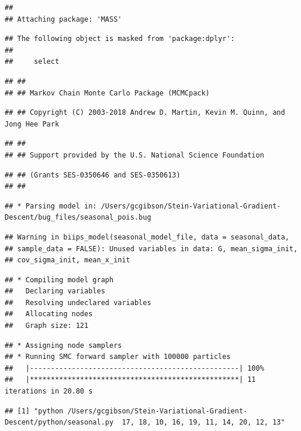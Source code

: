 \documentclass[]{article}
\begin{document}
\begin{verbatim}
## 
## Attaching package: 'MASS'
\end{verbatim}

\begin{verbatim}
## The following object is masked from 'package:dplyr':
## 
##     select
\end{verbatim}

\begin{verbatim}
## ##
## ## Markov Chain Monte Carlo Package (MCMCpack)
\end{verbatim}

\begin{verbatim}
## ## Copyright (C) 2003-2018 Andrew D. Martin, Kevin M. Quinn, and Jong Hee Park
\end{verbatim}

\begin{verbatim}
## ##
## ## Support provided by the U.S. National Science Foundation
\end{verbatim}

\begin{verbatim}
## ## (Grants SES-0350646 and SES-0350613)
## ##
\end{verbatim}

\begin{verbatim}
## * Parsing model in: /Users/gcgibson/Stein-Variational-Gradient-Descent/bug_files/seasonal_pois.bug
\end{verbatim}

\begin{verbatim}
## Warning in biips_model(seasonal_model_file, data = seasonal_data,
## sample_data = FALSE): Unused variables in data: G, mean_sigma_init,
## cov_sigma_init, mean_x_init
\end{verbatim}

\begin{verbatim}
## * Compiling model graph
##   Declaring variables
##   Resolving undeclared variables
##   Allocating nodes
##   Graph size: 121
\end{verbatim}

\begin{verbatim}
## * Assigning node samplers
## * Running SMC forward sampler with 100000 particles
##   |--------------------------------------------------| 100%
##   |**************************************************| 11 iterations in 20.80 s
\end{verbatim}

\begin{verbatim}
## [1] "python /Users/gcgibson/Stein-Variational-Gradient-Descent/python/seasonal.py  17, 18, 10, 16, 19, 11, 14, 20, 12, 13"
\end{verbatim}
\end{document}
